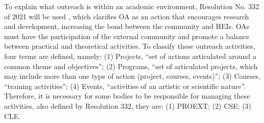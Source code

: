 


To explain what outreach is within an academic environment, Resolution No. 332 of 2021 will be used \cite{Resolucao-332:2021}, which clarifies \ac{OA} as an action that encourages research and development, increasing the bond between the community and \acp{HEI}. 
\acp{OA} must have the participation of the external community and promote a balance between practical and theoretical activities. 
To classify these outreach activities, four terms are defined, namely: 
(1) Projects, ``set of actions articulated around a common theme and objectives''; 
(2) Programs, ``set of articulated projects, which may include more than one type of action (project, courses, events)''; 
(3) Courses, ``training activities''; 
(4) Events, ``activities of an artistic or scientific nature''. 
Therefore, it is necessary for some bodies to be responsible for managing these activities, also defined by Resolution 332, they are: (1) \ac{PROEXT}; (2) \ac{CSE}; (3) \ac{CLE}.




